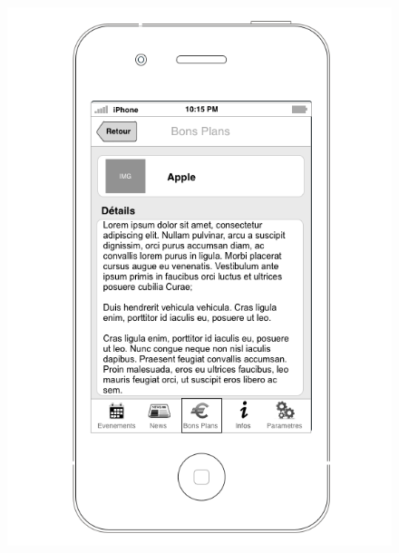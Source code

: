 \documentclass[a4paper, 11px]{article}
\begin{document}
\begin{figure}[htbp]
\begin{minipage}[c]{.50\linewidth}
\begin{center}
			\includegraphics[scale=0.3]{../../Sketch/iOS/bons_plans_detail.png}
		\end{center}
	\end{minipage}
\end{figure}

\vfill
\clearpage
\end{document}
